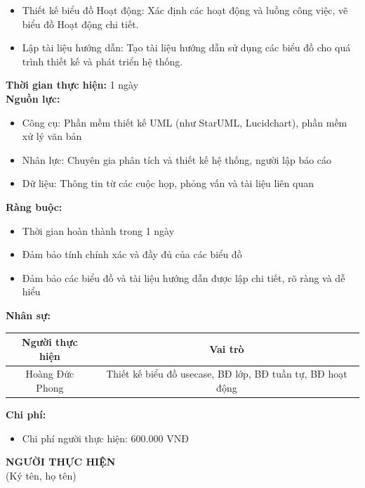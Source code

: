 {\begin{minipage}{\textwidth}
\begin{itemize}
        \item Thiết kế biểu đồ Hoạt động: Xác định các hoạt động và luồng công việc, vẽ biểu đồ Hoạt động chi tiết.
        \item Lập tài liệu hướng dẫn: Tạo tài liệu hướng dẫn sử dụng các biểu đồ cho quá trình thiết kế và phát triển hệ thống.
    \end{itemize}
    \vspace{0.5cm}
    \noindent \textbf{Thời gian thực hiện:} 1 ngày \\
    \noindent \textbf{Nguồn lực:}
    \begin{itemize}
        \item Công cụ: Phần mềm thiết kế UML (như StarUML, Lucidchart), phần mềm xử lý văn bản
        \item Nhân lực: Chuyên gia phân tích và thiết kế hệ thống, người lập báo cáo
        \item Dữ liệu: Thông tin từ các cuộc họp, phỏng vấn và tài liệu liên quan
    \end{itemize}
    \vspace{0.5cm}
    \noindent \textbf{Ràng buộc:}
    \begin{itemize}
        \item Thời gian hoàn thành trong 1 ngày
        \item Đảm bảo tính chính xác và đầy đủ của các biểu đồ
        \item Đảm bảo các biểu đồ và tài liệu hướng dẫn được lập chi tiết, rõ ràng và dễ hiểu
    \end{itemize}
    \vspace{0.5cm}
    \noindent \textbf{Nhân sự:}
    \begin{longtable}{|c|c|}
    \hline
    \textbf{Người thực hiện} & \textbf{Vai trò} \\
    \hline
    Hoàng Đức Phong & Thiết kế biểu đồ usecase, BĐ lớp, BĐ tuần tự, BĐ hoạt động \\
    \hline
    \end{longtable}
    \vspace{0.5cm}
    \noindent \textbf{Chi phí:}
    \begin{itemize}
        \item Chi phí người thực hiện: 600.000 VNĐ
    \end{itemize}
    \vspace{1cm}
    \begin{flushleft}
        \hspace{8cm} \textbf{NGƯỜI THỰC HIỆN} \\
        \hspace{8.8cm} (Ký tên, họ tên) \\
        \vspace{1cm}
    \end{flushleft}
    \end{minipage}
}
% 
